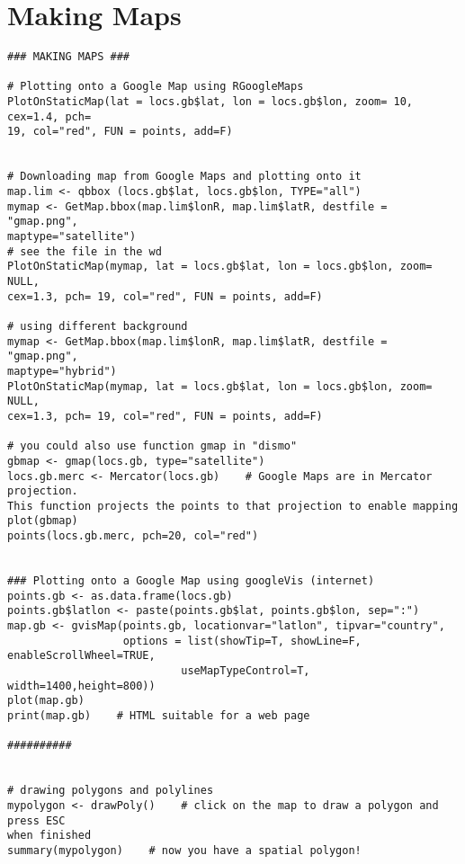 \documentclass[11pt]{article} %
\begin{document}
\section{Making Maps}
\begin{verbatim}
### MAKING MAPS ###
 
# Plotting onto a Google Map using RGoogleMaps
PlotOnStaticMap(lat = locs.gb$lat, lon = locs.gb$lon, zoom= 10, cex=1.4, pch=
19, col="red", FUN = points, add=F)
 
 
# Downloading map from Google Maps and plotting onto it
map.lim <- qbbox (locs.gb$lat, locs.gb$lon, TYPE="all")
mymap <- GetMap.bbox(map.lim$lonR, map.lim$latR, destfile = "gmap.png",
maptype="satellite")
# see the file in the wd
PlotOnStaticMap(mymap, lat = locs.gb$lat, lon = locs.gb$lon, zoom= NULL,
cex=1.3, pch= 19, col="red", FUN = points, add=F)
 
# using different background
mymap <- GetMap.bbox(map.lim$lonR, map.lim$latR, destfile = "gmap.png",
maptype="hybrid")
PlotOnStaticMap(mymap, lat = locs.gb$lat, lon = locs.gb$lon, zoom= NULL,
cex=1.3, pch= 19, col="red", FUN = points, add=F)
 
# you could also use function gmap in "dismo"
gbmap <- gmap(locs.gb, type="satellite")
locs.gb.merc <- Mercator(locs.gb)    # Google Maps are in Mercator projection.
This function projects the points to that projection to enable mapping
plot(gbmap)
points(locs.gb.merc, pch=20, col="red")
 
 
### Plotting onto a Google Map using googleVis (internet)
points.gb <- as.data.frame(locs.gb)
points.gb$latlon <- paste(points.gb$lat, points.gb$lon, sep=":")
map.gb <- gvisMap(points.gb, locationvar="latlon", tipvar="country",
                  options = list(showTip=T, showLine=F, enableScrollWheel=TRUE,
                           useMapTypeControl=T, width=1400,height=800))
plot(map.gb)
print(map.gb)    # HTML suitable for a web page
 
##########
 
 
# drawing polygons and polylines
mypolygon <- drawPoly()    # click on the map to draw a polygon and press ESC
when finished
summary(mypolygon)    # now you have a spatial polygon!
 
\end{verbatim}
\end{document}
